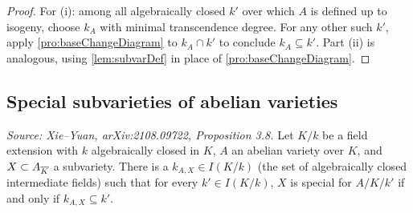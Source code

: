 \begin{proof}
  For (i): among all algebraically closed \(k'\) over which \(A\) is defined up to isogeny,
  choose \(k_A\) with minimal transcendence degree.  For any other such \(k'\), apply
  \cref{pro:baseChangeDiagram} to \(k_A \cap k'\) to conclude \(k_A \subseteq k'\).
  Part (ii) is analogous, using \cref{lem:subvarDef} in place of \cref{pro:baseChangeDiagram}.
\end{proof}

\subsection{Special subvarieties of abelian varieties}

\begin{proposition}
  \label{pro:lemNonSpecial}
  \textit{Source: Xie--Yuan, arXiv:2108.09722, Proposition 3.8.}
  Let \(K/k\) be a field extension with \(k\) algebraically closed in \(K\), \(A\) an
  abelian variety over \(K\), and \(X \subset A_{\overline{K}}\) a subvariety.
  There is a \(k_{A,X} \in I(K/k)\) (the set of algebraically closed intermediate
  fields) such that for every \(k' \in I(K/k)\), \(X\) is special for \(A/K/k'\) if and
  only if \(k_{A,X} \subseteq k'\).
\end{proposition}

